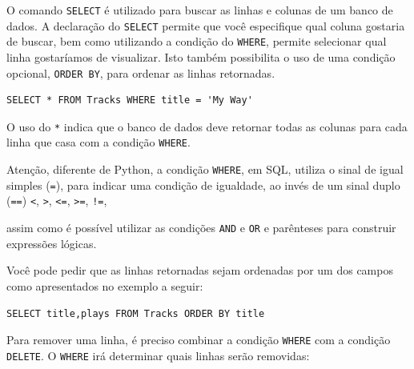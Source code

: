 
O comando {\tt SELECT} é utilizado para buscar as linhas e colunas de um banco
de dados. A declaração do {\tt SELECT} permite que você especifique qual coluna
gostaria de buscar, bem como utilizando a condição do {\tt WHERE}, permite
selecionar qual linha gostaríamos de visualizar. Isto também possibilita o uso
de uma condição opcional, {\tt ORDER BY}, para ordenar as linhas retornadas.

\beforeverb
\begin{verbatim}
SELECT * FROM Tracks WHERE title = 'My Way'
\end{verbatim}
\afterverb
%

O uso do \verb"*" indica que o banco de dados deve retornar todas as colunas
para cada linha que casa com a condição {\tt WHERE}.


Atenção, diferente de Python, a condição {\tt WHERE}, em SQL, utiliza o sinal
de igual simples (\verb"="), para indicar uma condição de igualdade, ao invés de
um sinal duplo (\verb"==")
\verb"<",
\verb">",
\verb"<=",
\verb">=",
\verb"!=",

assim como é possível utilizar as condições {\tt AND} e {\tt OR} e parênteses
para construir expressões lógicas.


Você pode pedir que as linhas retornadas sejam ordenadas por um dos campos
como apresentados no exemplo a seguir:
\beforeverb
\begin{verbatim}
SELECT title,plays FROM Tracks ORDER BY title
\end{verbatim}
\afterverb
%
%
Para remover uma linha, é preciso combinar a condição {\tt WHERE} com a
condição {\tt DELETE}. O {\tt WHERE} irá determinar quais linhas serão
removidas:

